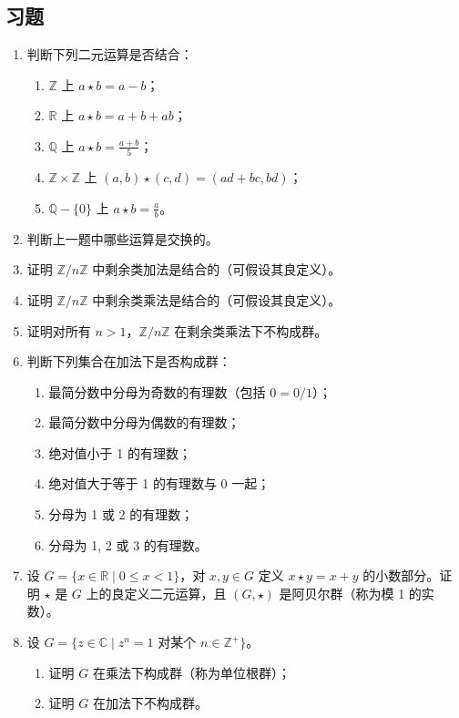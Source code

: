 \subsection*{习题}

\begin{enumerate}
\item 判断下列二元运算是否结合：
\begin{enumerate}
\item \(\mathbb{Z}\) 上 \(a \star b = a - b\)；
\item \(\mathbb{R}\) 上 \(a \star b = a + b + ab\)；
\item \(\mathbb{Q}\) 上 \(a \star b = \frac{a+b}{5}\)；
\item \(\mathbb{Z} \times \mathbb{Z}\) 上 \((a,b) \star (c,d) = (ad+bc, bd)\)；
\item \(\mathbb{Q} - \{0\}\) 上 \(a \star b = \frac{a}{b}\)。
\end{enumerate}
\item 判断上一题中哪些运算是交换的。
\item 证明 \(\mathbb{Z}/n\mathbb{Z}\) 中剩余类加法是结合的（可假设其良定义）。
\item 证明 \(\mathbb{Z}/n\mathbb{Z}\) 中剩余类乘法是结合的（可假设其良定义）。
\item 证明对所有 \(n > 1\)，\(\mathbb{Z}/n\mathbb{Z}\) 在剩余类乘法下不构成群。
\item 判断下列集合在加法下是否构成群：
\begin{enumerate}
\item 最简分数中分母为奇数的有理数（包括 \(0 = 0/1\)）；
\item 最简分数中分母为偶数的有理数；
\item 绝对值小于 1 的有理数；
\item 绝对值大于等于 1 的有理数与 0 一起；
\item 分母为 1 或 2 的有理数；
\item 分母为 1, 2 或 3 的有理数。
\end{enumerate}
\item 设 \(G = \{x \in \mathbb{R} \mid 0 \le x < 1\}\)，对 \(x, y \in G\) 定义 \(x \star y = x + y\) 的小数部分。证明 \(\star\) 是 \(G\) 上的良定义二元运算，且 \((G, \star)\) 是阿贝尔群（称为模 1 的实数）。
\item 设 \(G = \{z \in \mathbb{C} \mid z^n = 1 \text{ 对某个 } n \in \mathbb{Z}^+\}\)。
\begin{enumerate}
\item 证明 \(G\) 在乘法下构成群（称为单位根群）；
\item 证明 \(G\) 在加法下不构成群。

\end{enumerate}
\end{enumerate}
